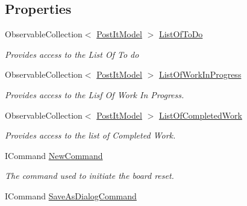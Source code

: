 \subsection*{Properties}
\begin{DoxyCompactItemize}
\item 
Observable\+Collection$<$ \hyperlink{class_kanban_board_1_1_model_1_1_post_it_model}{Post\+It\+Model} $>$ \hyperlink{class_kanban_board_1_1_view_model_1_1_main_view_model_a250c79012624be5145f7a08ce9fdd4d8}{List\+Of\+To\+Do}
\begin{DoxyCompactList}\small\item\em Provides access to the List Of To do \end{DoxyCompactList}\item 
Observable\+Collection$<$ \hyperlink{class_kanban_board_1_1_model_1_1_post_it_model}{Post\+It\+Model} $>$ \hyperlink{class_kanban_board_1_1_view_model_1_1_main_view_model_ac28a6f8225d24e60ea7f1196cbf8d6a3}{List\+Of\+Work\+In\+Progress}
\begin{DoxyCompactList}\small\item\em Provides access to the Lisf Of Work In Progress. \end{DoxyCompactList}\item 
Observable\+Collection$<$ \hyperlink{class_kanban_board_1_1_model_1_1_post_it_model}{Post\+It\+Model} $>$ \hyperlink{class_kanban_board_1_1_view_model_1_1_main_view_model_a6ecd7d9718b6e320441c5938dc1c01eb}{List\+Of\+Completed\+Work}
\begin{DoxyCompactList}\small\item\em Provides access to the list of Completed Work. \end{DoxyCompactList}\item 
I\+Command \hyperlink{class_kanban_board_1_1_view_model_1_1_main_view_model_ac8874b3c893afb269198991fb7780d3e}{New\+Command}
\begin{DoxyCompactList}\small\item\em The command used to initiate the board reset. \end{DoxyCompactList}\item 
I\+Command \hyperlink{class_kanban_board_1_1_view_model_1_1_main_view_model_a67c109d76784dcd84a0b3601689518e9}{Save\+As\+Dialog\+Command}

\end{DoxyCompactItemize}
